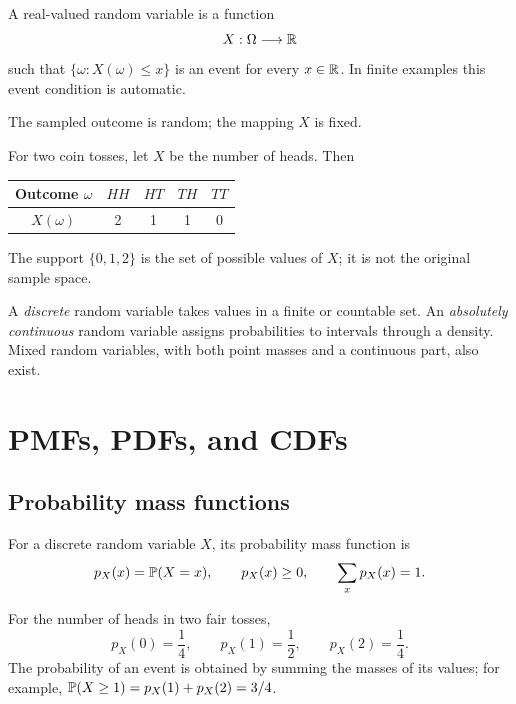 \begin{definition}
A real-valued random variable is a function
\[
  X:\Omega\longrightarrow\mathbb{R}
\]
such that \(\{\omega:X(\omega)\le x\}\) is an event for every
\(x\in\mathbb{R}\). In finite examples this event condition is automatic.
\end{definition}

The sampled outcome is random; the mapping \(X\) is fixed.

\begin{example}
For two coin tosses, let \(X\) be the number of heads. Then
\begin{center}
\begin{tabular}{@{}ccccc@{}}
\toprule
Outcome \(\omega\) & \(HH\) & \(HT\) & \(TH\) & \(TT\) \\
\midrule
\(X(\omega)\) & 2 & 1 & 1 & 0 \\
\bottomrule
\end{tabular}
\end{center}
The support \(\{0,1,2\}\) is the set of possible values of \(X\); it is not the
original sample space.
\end{example}

A \emph{discrete} random variable takes values in a finite or countable set. An
\emph{absolutely continuous} random variable assigns probabilities to intervals
through a density. Mixed random variables, with both point masses and a
continuous part, also exist.

\section{PMFs, PDFs, and CDFs}

\subsection{Probability mass functions}

\begin{definition}[PMF]
For a discrete random variable \(X\), its probability mass function is
\[
  p_X(x)=\mathbb{P}(X=x),\qquad p_X(x)\ge0,\qquad \sum_x p_X(x)=1.
\]
\end{definition}

For the number of heads in two fair tosses,
\[
  p_X(0)=\frac14,\qquad
  p_X(1)=\frac12,\qquad
  p_X(2)=\frac14.
\]
The probability of an event is obtained by summing the masses of its values;
for example, \(\mathbb{P}(X\ge1)=p_X(1)+p_X(2)=3/4\).

